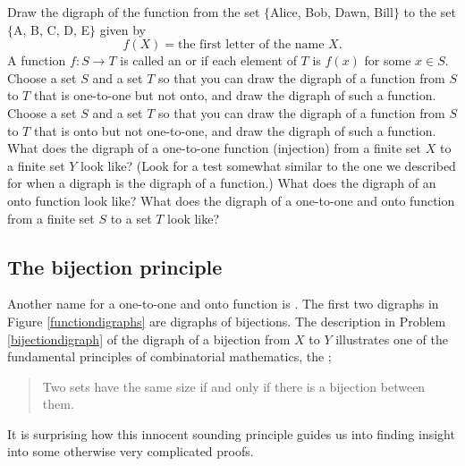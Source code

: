 \bp
\itemm Draw the digraph of the function from the set $\{$Alice, Bob, Dawn,
Bill$\}$ to the set $\{$A, B, C, D, E$\}$ given by $$f(X) = \mbox{the first
letter of the name $X$}.$$ 
\iteme A function
$f:S\rightarrow T$ is called an
 or
 if each
element of
$T$ is $f(x)$ for some $x\in S$.  Choose a set $S$ and a set $T$ so that you
can draw the digraph of a function from $S$ to $T$ that is one-to-one but not
onto, and draw the digraph of such a function.
\itemm Choose a set $S$ and a set $T$ so that you can draw the digraph of a
function from $S$ to $T$ that is onto but not one-to-one, and draw the
digraph of such a function.
\iteme What does the digraph of a one-to-one function
(injection) from a finite set $X$ to a finite set $Y$ look
like? (Look for a test somewhat similar to the one we  described for
when a digraph is the digraph of a function.)  What does the digraph of an
onto function look like?  What does the digraph of a one-to-one and onto 
function  from a finite set
$S$ to a set
$T$ look like? \label{bijectiondigraph}


\ep

\subsection{The bijection principle} Another name for a one-to-one
and onto function is .  The first two digraphs in Figure \ref{functiondigraphs} are
digraphs of bijections.  The description in Problem
\ref{bijectiondigraph} of the digraph of a bijection  from
$X$ to
$Y$ illustrates one of the fundamental principles of combinatorial
mathematics, the
;
\begin{quote}  Two sets have the same size if and only if
there is a bijection between them.
\end{quote} It is surprising how this innocent sounding
principle guides us into finding insight into some otherwise
very complicated proofs.

